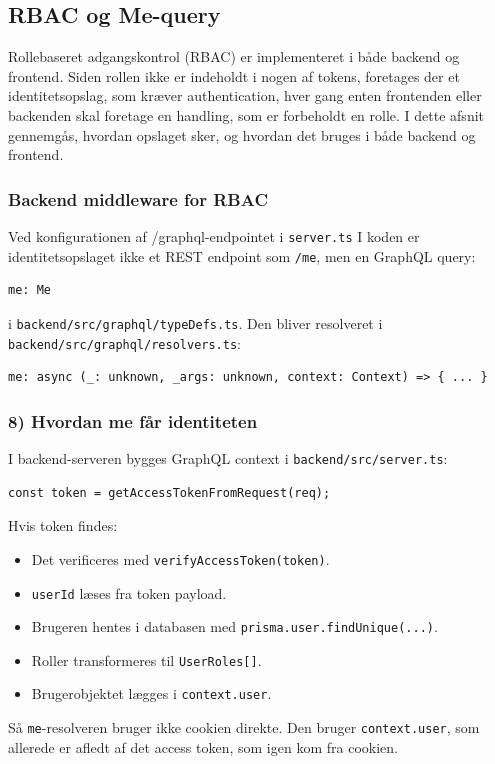 \subsection{RBAC og Me-query}
Rollebaseret adgangskontrol (RBAC) er implementeret i både backend og frontend.
Siden rollen ikke er indeholdt i nogen af tokens,
foretages der et identitetsopslag, som kræver authentication, hver gang enten frontenden eller
backenden skal foretage en handling, som er forbeholdt en rolle.
I dette afsnit gennemgås, hvordan opslaget sker, og hvordan det bruges i både backend og frontend.

\subsubsection{Backend middleware for RBAC}
Ved konfigurationen af /graphql-endpointet i \texttt{server.ts}
I koden er identitetsopslaget ikke et REST endpoint som \texttt{/me}, men en GraphQL query:
\begin{verbatim}
me: Me
\end{verbatim}
i \texttt{backend/src/graphql/typeDefs.ts}. Den bliver resolveret i \texttt{backend/src/graphql/resolvers.ts}:
\begin{verbatim}
me: async (_: unknown, _args: unknown, context: Context) => { ... }
\end{verbatim}

\subsubsection{8) Hvordan me får identiteten}
I backend-serveren bygges GraphQL context i \texttt{backend/src/server.ts}:
\begin{verbatim}
const token = getAccessTokenFromRequest(req);
\end{verbatim}
Hvis token findes:
\begin{itemize}
    \item Det verificeres med \texttt{verifyAccessToken(token)}.
    \item \texttt{userId} læses fra token payload.
    \item Brugeren hentes i databasen med \texttt{prisma.user.findUnique(...)}.
    \item Roller transformeres til \texttt{UserRoles[]}.
    \item Brugerobjektet lægges i \texttt{context.user}.
\end{itemize}
Så \texttt{me}-resolveren bruger ikke cookien direkte. Den bruger \texttt{context.user}, som allerede er afledt af det access token, som igen kom fra cookien.


